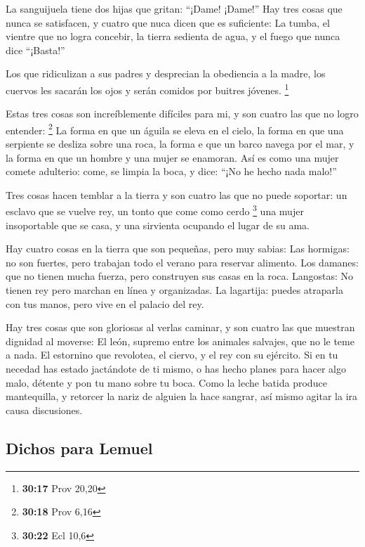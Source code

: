  La sanguijuela tiene dos hijas que gritan: ``¡Dame!
¡Dame!'' Hay tres cosas que nunca se satisfacen, y cuatro que nuca dicen
que es suficiente:  La tumba, el vientre que no logra
concebir, la tierra sedienta de agua, y el fuego que nunca dice
``¡Basta!''

 Los que ridiculizan a sus padres y desprecian la
obediencia a la madre, los cuervos les sacarán los ojos y serán comidos
por buitres jóvenes. \footnote{\textbf{30:17} Prov 20,20}

 Estas tres cosas son increíblemente difíciles para mi, y
son cuatro las que no logro entender: \footnote{\textbf{30:18} Prov 6,16}
 La forma en que un águila se eleva en el cielo, la forma
en que una serpiente se desliza sobre una roca, la forma e que un barco
navega por el mar, y la forma en que un hombre y una mujer se enamoran.
 Así es como una mujer comete adulterio: come, se limpia la
boca, y dice: ``¡No he hecho nada malo!''

 Tres cosas hacen temblar a la tierra y son cuatro las que
no puede soportar:  un esclavo que se vuelve rey, un tonto
que come como cerdo \footnote{\textbf{30:22} Ecl 10,6}  una
mujer insoportable que se casa, y una sirvienta ocupando el lugar de su
ama.

 Hay cuatro cosas en la tierra que son pequeñas, pero muy
sabias:  Las hormigas: no son fuertes, pero trabajan todo
el verano para reservar alimento.  Los damanes: que no
tienen mucha fuerza, pero construyen sus casas en la roca. 
Langostas: No tienen rey pero marchan en línea y organizadas.
 La lagartija: puedes atraparla con tus manos, pero vive en
el palacio del rey.

 Hay tres cosas que son gloriosas al verlas caminar, y son
cuatro las que muestran dignidad al moverse:  El león,
supremo entre los animales salvajes, que no le teme a nada.
 El estornino que revolotea, el ciervo, y el rey con su
ejército.  Si en tu necedad has estado jactándote de ti
mismo, o has hecho planes para hacer algo malo, détente y pon tu mano
sobre tu boca.  Como la leche batida produce mantequilla, y
retorcer la nariz de alguien la hace sangrar, así mismo agitar la ira
causa discusiones.

\hypertarget{dichos-para-lemuel}{%
\subsection{Dichos para Lemuel}\label{dichos-para-lemuel}}

